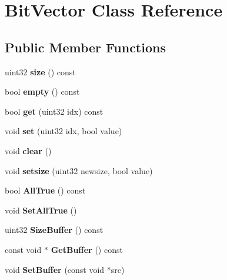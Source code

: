 \section{BitVector Class Reference}
\label{classBitVector}
\subsection*{Public Member Functions}
\begin{DoxyCompactItemize}
\item 
uint32 {\bfseries size} () const \label{classBitVector_a3f59346049c718e57463397eec090918}

\item 
bool {\bfseries empty} () const \label{classBitVector_a34e03150d348a6351e649853d86c5955}

\item 
bool {\bfseries get} (uint32 idx) const \label{classBitVector_a2ebfcb52874a22e384669e14d2c8f663}

\item 
void {\bfseries set} (uint32 idx, bool value)\label{classBitVector_a6cb40f88a21b22cb25c6aba3493d0ff7}

\item 
void {\bfseries clear} ()\label{classBitVector_a673b530bb6e520f7f7fa90070e0034db}

\item 
void {\bfseries setsize} (uint32 newsize, bool value)\label{classBitVector_a463ce03b7d2e86c3b30103ca24da6c52}

\item 
bool {\bfseries AllTrue} () const \label{classBitVector_a32383cd1c6b20ee700afc3911b3a1c7a}

\item 
void {\bfseries SetAllTrue} ()\label{classBitVector_a667fdbe1dfde54a7f9d6c8ef29b13709}

\item 
uint32 {\bfseries SizeBuffer} () const \label{classBitVector_a886730527f73b61f55d5764e68830ec3}

\item 
const void $\ast$ {\bfseries GetBuffer} () const \label{classBitVector_a2cd24b2fd12c25390e944e9cc58d9a66}

\item 
void {\bfseries SetBuffer} (const void $\ast$src)\label{classBitVector_af63e5b978eac4de829cacf7665eca9a2}

\end{DoxyCompactItemize}
